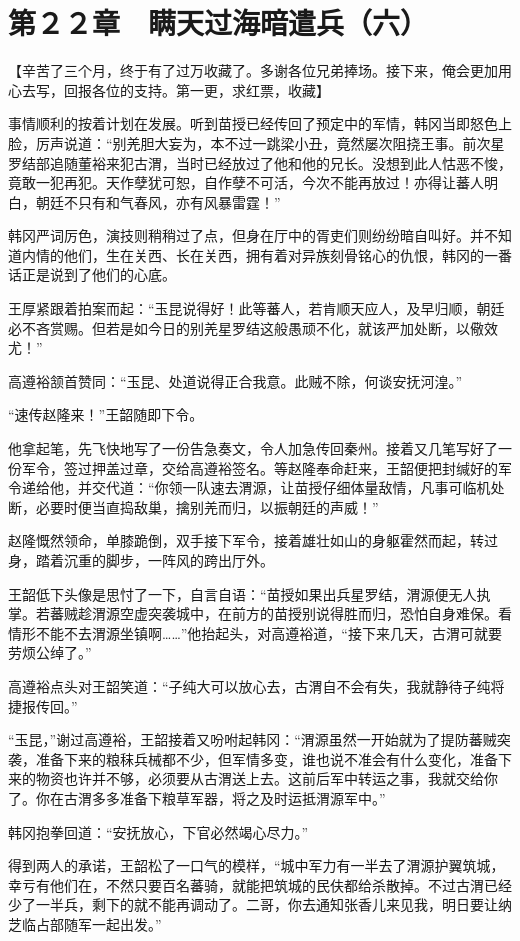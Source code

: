\section{第２２章　瞒天过海暗遣兵（六）}

【辛苦了三个月，终于有了过万收藏了。多谢各位兄弟捧场。接下来，俺会更加用心去写，回报各位的支持。第一更，求红票，收藏】

事情顺利的按着计划在发展。听到苗授已经传回了预定中的军情，韩冈当即怒色上脸，厉声说道：“别羌胆大妄为，本不过一跳梁小丑，竟然屡次阻挠王事。前次星罗结部追随董裕来犯古渭，当时已经放过了他和他的兄长。没想到此人怙恶不悛，竟敢一犯再犯。天作孽犹可恕，自作孽不可活，今次不能再放过！亦得让蕃人明白，朝廷不只有和气春风，亦有风暴雷霆！”

韩冈严词厉色，演技则稍稍过了点，但身在厅中的胥吏们则纷纷暗自叫好。并不知道内情的他们，生在关西、长在关西，拥有着对异族刻骨铭心的仇恨，韩冈的一番话正是说到了他们的心底。

王厚紧跟着拍案而起：“玉昆说得好！此等蕃人，若肯顺天应人，及早归顺，朝廷必不吝赏赐。但若是如今日的别羌星罗结这般愚顽不化，就该严加处断，以儆效尤！”

高遵裕颔首赞同：“玉昆、处道说得正合我意。此贼不除，何谈安抚河湟。”

“速传赵隆来！”王韶随即下令。

他拿起笔，先飞快地写了一份告急奏文，令人加急传回秦州。接着又几笔写好了一份军令，签过押盖过章，交给高遵裕签名。等赵隆奉命赶来，王韶便把封缄好的军令递给他，并交代道：“你领一队速去渭源，让苗授仔细体量敌情，凡事可临机处断，必要时便当直捣敌巢，擒别羌而归，以振朝廷的声威！”

赵隆慨然领命，单膝跪倒，双手接下军令，接着雄壮如山的身躯霍然而起，转过身，踏着沉重的脚步，一阵风的跨出厅外。

王韶低下头像是思忖了一下，自言自语：“苗授如果出兵星罗结，渭源便无人执掌。若蕃贼趁渭源空虚突袭城中，在前方的苗授别说得胜而归，恐怕自身难保。看情形不能不去渭源坐镇啊……”他抬起头，对高遵裕道，“接下来几天，古渭可就要劳烦公绰了。”

高遵裕点头对王韶笑道：“子纯大可以放心去，古渭自不会有失，我就静待子纯将捷报传回。”

“玉昆，”谢过高遵裕，王韶接着又吩咐起韩冈：“渭源虽然一开始就为了提防蕃贼突袭，准备下来的粮秣兵械都不少，但军情多变，谁也说不准会有什么变化，准备下来的物资也许并不够，必须要从古渭送上去。这前后军中转运之事，我就交给你了。你在古渭多多准备下粮草军器，将之及时运抵渭源军中。”

韩冈抱拳回道：“安抚放心，下官必然竭心尽力。”

得到两人的承诺，王韶松了一口气的模样，“城中军力有一半去了渭源护翼筑城，幸亏有他们在，不然只要百名蕃骑，就能把筑城的民伕都给杀散掉。不过古渭已经少了一半兵，剩下的就不能再调动了。二哥，你去通知张香儿来见我，明日要让纳芝临占部随军一起出发。”

